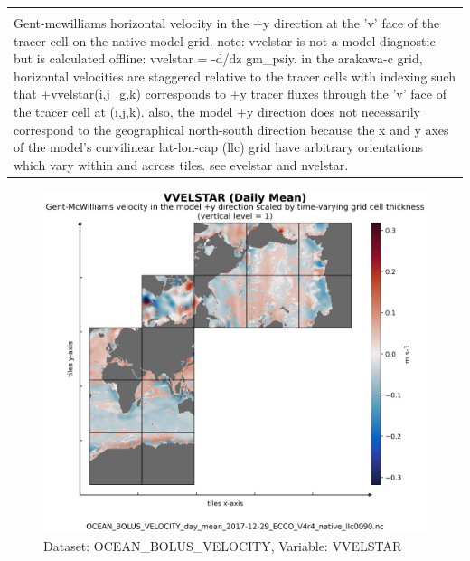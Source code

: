 \begin{longtable}{|m{}|m{}|m{}|m{}|}
{{{{{}}}}} \\ \hline
\rowcolor{lightgray} \multicolumn{4}{|c|}{\textbf{Comments}} \\ \hline
\multicolumn{4}{|p{1\textwidth}|}{\footnotesize{{Gent-mcwilliams horizontal velocity in the +y direction at the 'v' face of the tracer cell on the native model grid. note: vvelstar is not a model diagnostic but is calculated offline: vvelstar = -d/dz gm\_psiy. in the arakawa-c grid, horizontal velocities are staggered relative to the tracer cells with indexing such that +vvelstar(i,j\_g,k) corresponds to +y tracer fluxes through the 'v' face of the tracer cell at (i,j,k). also, the model +y direction does not necessarily correspond to the geographical north-south direction because the x and y axes of the model's curvilinear lat-lon-cap (llc) grid have arbitrary orientations which vary within and across tiles. see evelstar and nvelstar.}}} \\ \hline
\end{longtable}

\begin{figure}[H]
\centering
\includegraphics[scale=0.55]{../images/plots/native_plots/Gent-McWilliams_Ocean_Bolus_Velocity/VVELSTAR.png}
\caption{Dataset: OCEAN\_BOLUS\_VELOCITY, Variable: VVELSTAR}
\label{tab:table-OCEAN_BOLUS_VELOCITY_VVELSTAR-Plot}
\end{figure}
\newpage
\pagebreak
